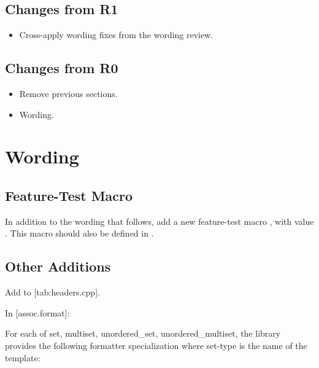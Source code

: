 \subsection{Changes from R1}

\begin{itemize}
  \item Cross-apply wording fixes from the  wording review.
\end{itemize}

\subsection{Changes from R0}

\begin{itemize}
  \item Remove previous sections.
  \item Wording.
\end{itemize}

\section{Wording}

\subsection{Feature-Test Macro}

In addition to the wording that follows, add a new feature-test macro
, with value .  This macro should also
be defined in .

\subsection{Other Additions}

Add  to [tab:headers.cpp].

In [assoc.format]:

For each of set, multiset, unordered_set,
unordered_multiset, the library provides
the following formatter specialization where set-type is the name of the
template:
